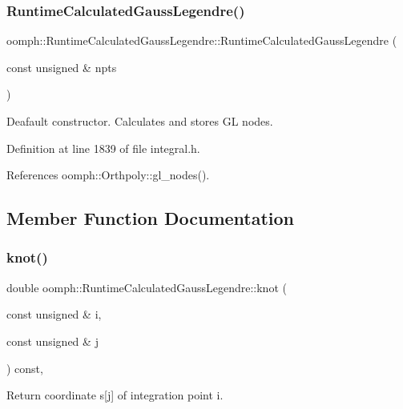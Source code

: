 \subsubsection{\texorpdfstring{Runtime\+Calculated\+Gauss\+Legendre()}{RuntimeCalculatedGaussLegendre()}}
{\footnotesize\ttfamily oomph\+::\+Runtime\+Calculated\+Gauss\+Legendre\+::\+Runtime\+Calculated\+Gauss\+Legendre (\begin{DoxyParamCaption}\item[{const unsigned \&}]{npts }\end{DoxyParamCaption})\hspace{0.3cm}{\ttfamily [inline]}}



Deafault constructor. Calculates and stores GL nodes. 



Definition at line 1839 of file integral.\+h.



References oomph\+::\+Orthpoly\+::gl\+\_\+nodes().



\subsection{Member Function Documentation}
\mbox{\label{classoomph_1_1RuntimeCalculatedGaussLegendre_ae477f9f837f36cc3d5456aa5f6de3f8e}} 
\subsubsection{\texorpdfstring{knot()}{knot()}}
{\footnotesize\ttfamily double oomph\+::\+Runtime\+Calculated\+Gauss\+Legendre\+::knot (\begin{DoxyParamCaption}\item[{const unsigned \&}]{i,  }\item[{const unsigned \&}]{j }\end{DoxyParamCaption}) const\hspace{0.3cm}{\ttfamily [inline]}, {\ttfamily [virtual]}}



Return coordinate s\mbox{[}j\mbox{]} of integration point i. 



